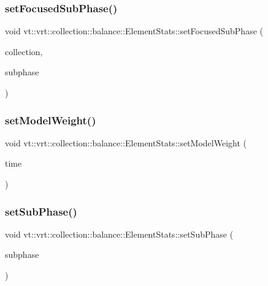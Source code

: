 \subsubsection{\texorpdfstring{set\+Focused\+Sub\+Phase()}{setFocusedSubPhase()}}
{\footnotesize\ttfamily void vt\+::vrt\+::collection\+::balance\+::\+Element\+Stats\+::set\+Focused\+Sub\+Phase (\begin{DoxyParamCaption}\item[{\hyperlink{namespacevt_a1b417dd5d684f045bb58a0ede70045ac}{Virtual\+Proxy\+Type}}]{collection,  }\item[{\hyperlink{namespacevt_ae78cbfdf1e57470e33eedb074f2beeba}{Subphase\+Type}}]{subphase }\end{DoxyParamCaption})\hspace{0.3cm}{\ttfamily [static]}}

\mbox{\label{structvt_1_1vrt_1_1collection_1_1balance_1_1_element_stats_aebacf2dd9e43b4886956741be1647d84}} 
\subsubsection{\texorpdfstring{set\+Model\+Weight()}{setModelWeight()}}
{\footnotesize\ttfamily void vt\+::vrt\+::collection\+::balance\+::\+Element\+Stats\+::set\+Model\+Weight (\begin{DoxyParamCaption}\item[{\hyperlink{namespacevt_a876a9d0cd5a952859c72de8a46881442}{Time\+Type} const \&}]{time }\end{DoxyParamCaption})}

\mbox{\label{structvt_1_1vrt_1_1collection_1_1balance_1_1_element_stats_a6f24460421195baa579f9a0dc7f6569c}} 
\subsubsection{\texorpdfstring{set\+Sub\+Phase()}{setSubPhase()}}
{\footnotesize\ttfamily void vt\+::vrt\+::collection\+::balance\+::\+Element\+Stats\+::set\+Sub\+Phase (\begin{DoxyParamCaption}\item[{\hyperlink{namespacevt_ae78cbfdf1e57470e33eedb074f2beeba}{Subphase\+Type}}]{subphase }\end{DoxyParamCaption})}

